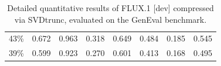 \begin{table}[H]
{\begin{tabular}{cccccccc}
			43\% &    %
			0.672 &    %
			0.963 &    %
			0.318 &    %
			0.649 &    %
			0.484 &    %
			0.185 &    %
			0.545     %
			\\
		
			39\% &    %
			0.599 &    %
			0.923 &    %
			0.270 &    %
			0.601 &    %
			0.413 &    %
			0.168 &    %
			0.495     %
			\\
			\bottomrule
		\end{tabular}
	}
	\smallskip
	\caption[\gls{SVD}trunc on FLUX.1 {[dev]}: Detailed GenEval Results]{Detailed quantitative results of FLUX.1 {[dev]} compressed via \gls{SVD}trunc, evaluated on the GenEval benchmark.}
	\label{tab:sup_geneval}
\end{table}


